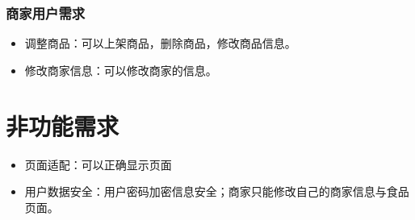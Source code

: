 \subsubsection{商家用户需求}
\begin{itemize}
    \item {调整商品}：可以上架商品，删除商品，修改商品信息。
    \item{修改商家信息}：可以修改商家的信息。
\end{itemize}

\section{非功能需求}
\begin{itemize}
    \item{页面适配}：可以正确显示页面
    \item{用户数据安全}：用户密码加密信息安全；商家只能修改自己的商家信息与食品页面。
\end{itemize}

